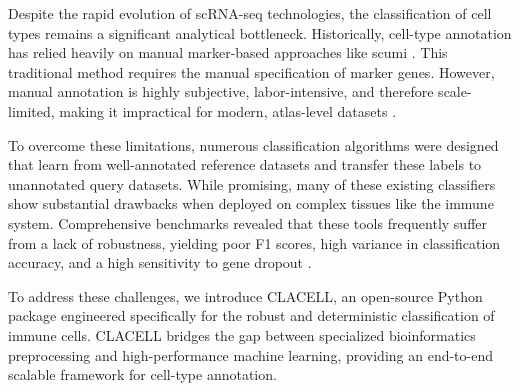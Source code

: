 \documentclass[11pt]{article}
\begin{document}
Despite the rapid evolution of scRNA-seq technologies, the classification of cell types remains a significant analytical bottleneck. Historically, cell-type annotation has relied heavily on manual marker-based approaches like scumi \cite{ding_systematic_2020}. This traditional method requires the manual specification of marker genes. However, manual annotation is highly subjective, labor-intensive, and therefore scale-limited, making it impractical for modern, atlas-level datasets \cite{abdelaal_comparison_2019}.

To overcome these limitations, numerous classification algorithms were designed that learn from well-annotated reference datasets and transfer these labels to unannotated query datasets. While promising, many of these existing classifiers show substantial drawbacks when deployed on complex tissues like the immune system. Comprehensive benchmarks revealed that these tools frequently suffer from a lack of robustness, yielding poor F1 scores, high variance in classification accuracy, and a high sensitivity to gene dropout \cite{abdelaal_comparison_2019}. %


To address these challenges, we introduce CLACELL, an open-source Python package engineered specifically for the robust and deterministic classification of immune cells.
CLACELL bridges the gap between specialized bioinformatics preprocessing and high-performance machine learning, providing an end-to-end scalable framework for cell-type annotation. %
\end{document}
